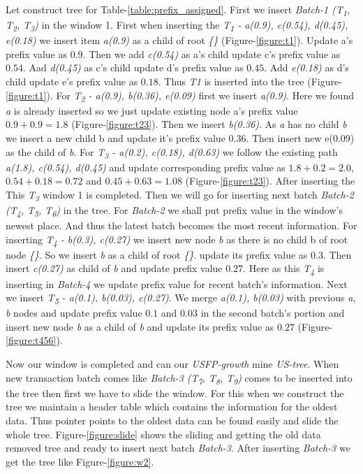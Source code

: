 	Let construct tree for Table-\ref{table:prefix_assigned}. First we insert \emph{Batch-1 (T\textsubscript{1}, T\textsubscript{2}, T\textsubscript{3})} in the window 1. First when inserting the \emph{T\textsubscript{1} - a(0.9), c(0.54), d(0.45), e(0.18)} we insert item \emph{a(0.9)} as a child of root \emph{\{\}} (Figure-\ref{figure:t1}). Update a's prefix value as $0.9$. Then we add \emph{c(0.54)} as a's child update c's prefix value as $0.54$. Aad \emph{d(0.45)} as c's child update d's prefix value as $0.45$. Add \emph{e(0.18)} as d's child update e's prefix value as $0.18$. Thus \emph{T1} is inserted into the tree (Figure-\ref{figure:t1}). For \emph{T\textsubscript{2} - a(0.9), b(0.36), e(0.09)} first we insert \emph{a(0.9)}. Here we found \emph{a} is already inserted so we just update existing node a's prefix value $0.9 + 0.9 = 1.8$ (Figure-\ref{figure:t23}). Then we insert \emph{b(0.36)}. As \emph{a} has no child \emph{b} we insert a new child b and update it's prefix value $0.36$. Then insert new e(0.09) as the child of \emph{b}. For \emph{T\textsubscript{3} - a(0.2), c(0.18), d(0.63)} we follow the existing path \emph{a(1.8), c(0.54), d(0.45)} and update corresponding prefix value as $1.8 + 0.2 = 2.0$, $0.54 + 0.18 = 0.72$ and $0.45 + 0.63 = 1.08$ (Figure-\ref{figure:t23}). After inserting the This \emph{T\textsubscript{3}} window 1 is completed. Then we will go for inserting next batch \emph{Batch-2 (T\textsubscript{4}, T\textsubscript{5}, T\textsubscript{6})} in the tree. For \emph{Batch-2} we shall put prefix value in the window's newest place. And thus the latest batch becomes the most recent information. For inserting \emph{T\textsubscript{4} - b(0.3), c(0.27)} we insert new node \emph{b} as there is no child b of root node \emph{\{\}}. So we insert \emph{b} as a child of root \emph{\{\}}. update its prefix value as $0.3$. Then insert \emph{c(0.27)} as child of \emph{b} and update prefix value $0.27$. Here as this \emph{T\textsubscript{4}} is inserting in \emph{Batch-4} we update prefix value for recent batch's information. Next we insert \emph{T\textsubscript{5} - a(0.1), b(0.03), c(0.27)}. We merge \emph{a(0.1), b(0.03)} with previous \emph{a, b } nodes and update prefix value $0.1$ and $0.03$ in the second batch's portion and insert new node \emph{b} as a child of \emph{b} and update its prefix value as $0.27$ (Figure-\ref{figure:t456}).
	
	Now our window is completed and can our \emph{USFP-growth} mine \emph {US-tree}. When new transaction batch comes like \emph{Batch-3 (T\textsubscript{7}, T\textsubscript{8}, T\textsubscript{9})} comes to be inserted into the tree then first we have to slide the window. For this when we construct the tree we maintain a header table which contains the information for the oldest data. Thus pointer points to the oldest data can be found easily and slide the whole tree. Figure-\ref{figure:slide} shows the sliding and getting the old data removed tree and ready to insert next batch \emph{Batch-3}. After inserting \emph{Batch-3} we get the tree like Figure-\ref{figure:w2}. 
